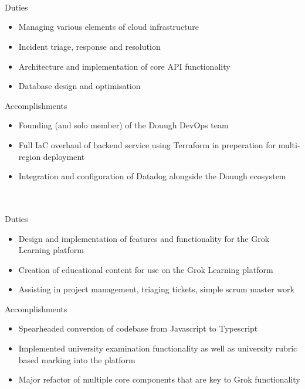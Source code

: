 \documentclass{resume}
\begin{document}
 \\
 \\
 \\
Duties \\
\begin{itemize}
  \item Managing various elements of cloud infrastructure
  \item Incident triage, response and resolution
  \item Architecture and implementation of core API functionality
  \item Database design and optimisation
\end{itemize}
Accomplishments \\
\begin{itemize}
  \item Founding (and solo member) of the Douugh DevOps team
  \item Full IaC overhaul of backend service using Terraform in preperation for multi-region deployment
  \item Integration and configuration of Datadog alongside the Douugh ecosystem
\end{itemize}

\bigskip
{} \\
 \\
Duties \\
\begin{itemize}
  \item Design and implementation of features and functionality for the Grok Learning platform
  \item Creation of educational content for use on the Grok Learning platform
  \item Assisting in project management, triaging tickets, simple scrum master work
\end{itemize}
Accomplishments \\
\begin{itemize}
  \item Spearheaded conversion of codebase from Javascript to Typescript
  \item Implemented university examination functionality as well as university rubric based marking into the platform
  \item Major refactor of multiple core components that are key to Grok functionality
\end{itemize}
\end{document}
